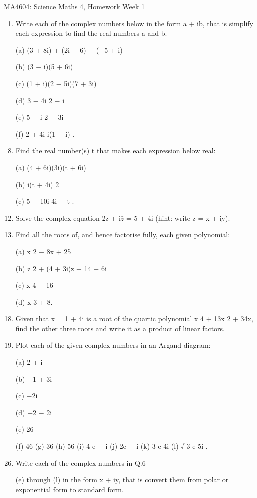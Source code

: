 MA4604: Science Maths 4, Homework Week 1
\begin{enumerate}
\item Write each of the complex numbers below in the form a + ib, that is simplify each
expression to find the real numbers a and b.
\item[(a)] (3 + 8i) + (2i − 6) − (−5 + i) \item[(b)] (3 − i)(5 + 6i) \item[(c)] (1 + i)(2 − 5i)(7 + 3i)
\item[(d)] 3 − 4i
2 − i
\item[(e)] 5 − i
2 − 3i
\item[(f)] 2 + 4i
i(1 − i)
.
\item Find the real number(s) t that makes each expression below real:
\item[(a)] (4 + 6i)(3i)(t + 6i) \item[(b)] i(t + 4i)
2
\item[(c)] 5 − 10i
4i + t
.
\item Solve the complex equation 2z + i$\bar{z}$ = 5 + 4i (hint: write z = x + iy).
\item Find all the roots of, and hence factorise fully, each given polynomial:
\item[(a)] x
2 − 8x + 25 \item[(b)] z
2 + (4 + 3i)z + 14 + 6i \item[(c)] x
4 − 16 \item[(d)] x
3 + 8.
\item Given that x = 1 + 4i is a root of the quartic polynomial x
4 + 13x
2 + 34x, find the other
three roots and write it as a product of linear factors.
\item Plot each of the given complex numbers in an Argand diagram:
\item[(a)] 2 + i \item[(b)] −1 + 3i \item[(c)] −2i \item[(d)] −2 − 2i
\item[(e)] 26
\item[(f)] 46
(g) 36
(h) 56 \pi
(i) 4 e
− i (j) 2e
− i (k) 3 e
4i (l) √
3 e
5i .
\item Write each of the complex numbers in Q.6 \item[(e)] through (l) in the form x + iy, that is
convert them from polar or exponential form to standard form.
\end{enumerate}

